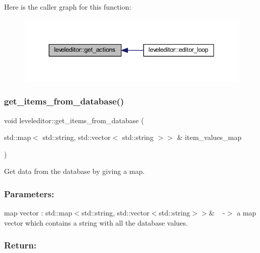 Here is the caller graph for this function\+:
\nopagebreak
\begin{figure}[H]
\begin{center}
\leavevmode
\includegraphics[width=345pt]{classleveleditor_aa5cd17c0004af09a706230a93abb10ee_icgraph}
\end{center}
\end{figure}
\mbox{\label{classleveleditor_ace9678fd4d5cdce53584dcc55d4e7c7b}} 
\subsubsection{\texorpdfstring{get\+\_\+items\+\_\+from\+\_\+database()}{get\_items\_from\_database()}}
{\footnotesize\ttfamily void leveleditor\+::get\+\_\+items\+\_\+from\+\_\+database (\begin{DoxyParamCaption}\item[{std\+::map$<$ std\+::string, std\+::vector$<$ std\+::string $>$$>$ \&}]{item\+\_\+values\+\_\+map }\end{DoxyParamCaption})\hspace{0.3cm}{\ttfamily [private]}}



Get data from the database by giving a map. 

\subsubsection*{Parameters\+: }

map vector \+: std\+::map$<$std\+::string, std\+::vector$<$std\+::string$>$$>$\& ~\newline
-\/$>$ a map vector which contains a string with all the database values.

\subsubsection*{Return\+: }

